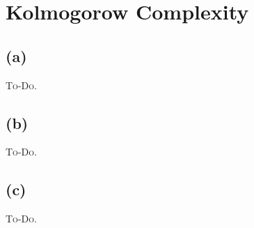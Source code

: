 

\setcounter{section}{3}


\section{Kolmogorow Complexity}

\subsection{(a)}

\textsc{To-Do.}

\subsection{(b)}

\textsc{To-Do.}

\subsection{(c)}

\textsc{To-Do.}


